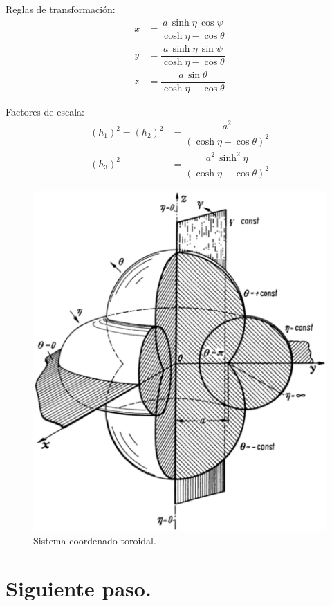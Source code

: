 \documentclass[12pt]{article}
\numberwithin{equation}{section}
\begin{document}
Reglas de transformación:
\begin{align*}
x &= \dfrac{a \, \sinh \eta \, \cos \psi}{\cosh \eta - \cos \theta} \\[0.5em]
y &= \dfrac{a \, \sinh \eta \, \sin \psi}{\cosh \eta - \cos \theta} \\[0.5em]
z &= \dfrac{a \, \sin \theta}{\cosh \eta - \cos \theta}
\end{align*}

Factores de escala:
\begin{align*}
(h_{1})^{2} = (h_{2})^{2} &= \dfrac{a^{2}}{(\cosh \eta - \cos \theta)^{2}} \\[0.5em]
(h_{3})^{2} &= \dfrac{a^{2} \, \sinh^{2} \eta}{(\cosh \eta - \cos \theta)^{2}}
\end{align*}

\begin{figure}[H]
    \centering
    \includegraphics[scale=0.4]{Imagenes/Sistema_Toroidal.eps}
    \caption{Sistema coordenado toroidal.}
\end{figure}

\section{Siguiente paso.}
\end{document}
